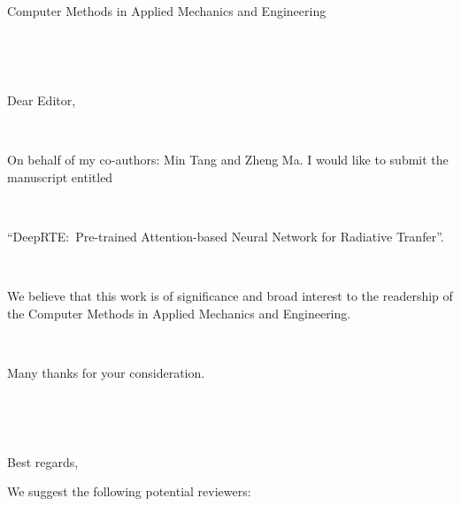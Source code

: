 \textheight=23.25cm
\textwidth=16cm
\parskip1pt

\address{%
      School of Mathematical Sciences, \\
      Shanghai Jiao Tong University, \\
      Shanghai, 200240, China
}
\signature{Yekun Zhu} %

\begin{letter}{ Computer Methods in Applied Mechanics and Engineering \\
      }

      \opening{\ }

      \

      Dear Editor,

      \

      On behalf of my co-authors: Min Tang and Zheng Ma. I would like to submit the manuscript entitled

      \
      
      ``DeepRTE:\ Pre-trained Attention-based Neural Network for Radiative Tranfer''.

      \

      We believe that this work is of significance and  broad interest to the readership
      of the Computer Methods in Applied Mechanics and Engineering.

      \

      Many thanks for your consideration.

      \

      \

      \closing{Best regards,}


\end{letter}

We suggest the following potential reviewers:

